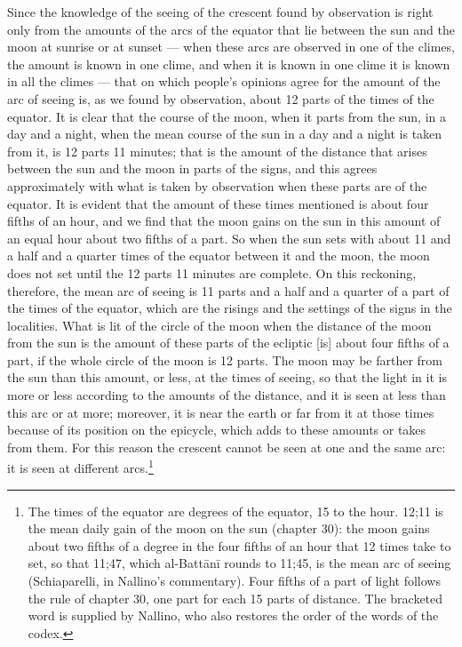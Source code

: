 \documentclass[11pt]{article}
\newcommand{\ArPage}[1]{\marginpar{\footnotesize\color{gray}Ar.\,p.\,#1}}
\begin{document}
\par \ArPage{130}Since the knowledge of the seeing of the crescent found by observation is right only from the amounts of the arcs of the equator that lie between the sun and the moon at sunrise or at sunset — when these arcs are observed in one of the climes, the amount is known in one clime, and when it is known in one clime it is known in all the climes — that on which people's opinions agree for the amount of the arc of seeing is, as we found by observation, about 12 parts of the times of the equator. It is clear that the course of the moon, when it parts from the sun, in a day and a night, when the mean course of the sun in a day and a night is taken from it, is 12 parts 11 minutes; that is the amount of the distance that arises between the sun and the moon in parts of the signs, and this agrees approximately with what is taken by observation when these parts are of the equator. It is evident that the amount of these times mentioned is about four fifths of an hour, and we find that the moon gains on the sun in this amount of an equal hour about two fifths of a part. So when the sun sets with about 11 and a half and a quarter times of the equator between it and the moon, the moon does not set until the 12 parts 11 minutes are complete. On this reckoning, therefore, the mean arc of seeing is 11 parts and a half and a quarter of a part of the times of the equator, which are the risings and the settings of the signs in the localities. What is lit of the circle of the moon when the distance of the moon from the sun is the amount of these parts of the ecliptic [is] about four fifths of a part, if the whole circle of the moon is 12 parts. The moon may be farther from the sun than this amount, or less, at the times of seeing, so that the light in it is more or less according to the amounts of the distance, and it is seen at less than this arc or at more; moreover, it is near the earth or far from it at those times because of its position on the epicycle, which adds to these amounts or takes from them. For this reason the crescent cannot be seen at one and the same arc: it is seen at different arcs.\footnote{The times of the equator are degrees of the equator, 15 to the hour. 12;11 is the mean daily gain of the moon on the sun (chapter 30): the moon gains about two fifths of a degree in the four fifths of an hour that 12 times take to set, so that 11;47, which al-Battānī rounds to 11;45, is the mean arc of seeing (Schiaparelli, in Nallino's commentary). Four fifths of a part of light follows the rule of chapter 30, one part for each 15 parts of distance. The bracketed word is supplied by Nallino, who also restores the order of the words of the codex.}\par
\end{document}

